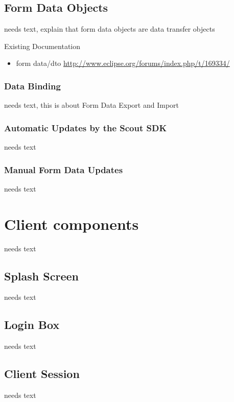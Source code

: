 \documentclass[a4paper,10pt,twoside]{book}
\begin{document}
\section{Form Data Objects}
needs text, explain that form data objects are data transfer objects

\noindent Existing Documentation
\begin{itemize}
  \item form data/dto \url{http://www.eclipse.org/forums/index.php/t/169334/}
\end{itemize}

\subsection{Data Binding}
needs text, this is about Form Data Export and Import

\subsection{Automatic Updates by the Scout SDK}
needs text

\subsection{Manual Form Data Updates}
needs text

\chapter{Client components}
needs text

\section{Splash Screen}
needs text

\section{Login Box}
needs text

\section{Client Session}
needs text
\end{document}
